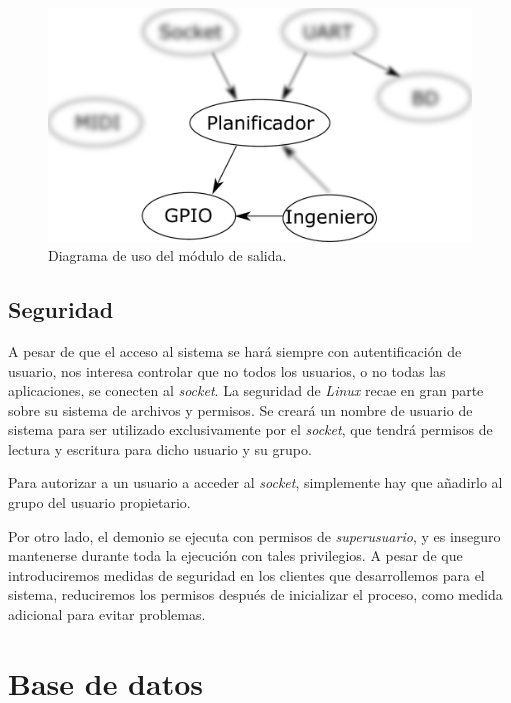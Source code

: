 \begin{figure}[H]
	\noindent \begin{centering}
		\includegraphics[width=\linewidth/2]{capitulo4/daemon_gpio}
		\par\end{centering}
	\smallskip
	\caption{\label{fig:daemon_gpio} Diagrama de uso del módulo de salida.}
\end{figure} 

\smallskip

\subsection{Seguridad}

A pesar de que el acceso al sistema se hará siempre con autentificación de usuario, nos interesa controlar que no todos los usuarios, o no todas las aplicaciones, se conecten al \textit{socket}. La seguridad de \textit{Linux} recae en gran parte sobre su sistema de archivos y permisos. Se creará un nombre de usuario de sistema para ser utilizado exclusivamente por el \textit{socket}, que tendrá permisos de lectura y escritura para dicho usuario y su grupo.

Para autorizar a un usuario a acceder al \textit{socket}, simplemente hay que añadirlo al grupo del usuario propietario.

Por otro lado, el demonio se ejecuta con permisos de \textit{superusuario}, y es inseguro mantenerse durante toda la ejecución con tales privilegios. A pesar de que introduciremos medidas de seguridad en los clientes que desarrollemos para el sistema, reduciremos los permisos después de inicializar el proceso, como medida adicional para evitar problemas.

\section{Base de datos}
\label{sec:database}

